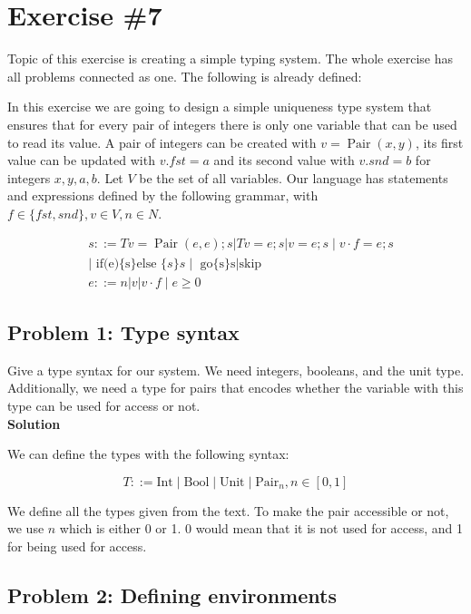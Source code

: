 \section{Exercise \#7}

Topic of this exercise is creating a simple typing system. The whole exercise has all problems connected as one. 
The following is already defined: 

In this exercise we are going to design a simple uniqueness type system that ensures that for every pair of integers there is only one variable that can be used to read its value. A pair of integers can be created with $v=\operatorname{Pair}(x, y)$, its first value can be updated with $v . f s t=a$ and its second value with $v . s n d=b$ for integers $x, y, a, b$. Let $V$ be the set of all variables. Our language has statements and expressions defined by the following grammar, with $f \in\{f s t, s n d\}, v \in V, n \in N$.

\[
\begin{aligned}
& s::=T v=\operatorname{Pair}(e, e) ; s|T v=e ; s| v=e ; s \mid v \cdot f=e ; s \\
& \mid \text { if(e)\{s\} else }\{s\} s \mid \text { go\{s\} s|skip } \\
& e::=n|v| v \cdot f \mid e \geq 0
\end{aligned}
\]


\subsection{Problem 1: Type syntax}


Give a type syntax for our system. We need integers, booleans, and the unit type.
Additionally, we need a type for pairs that encodes whether the variable with this type can be
used for access or not. \\

\textbf{Solution}

We can define the types with the following syntax:

\[
 T ::= \text{Int} \mid \text{Bool} \mid \text{Unit} \mid \text{Pair}_n, n \in [0,1] 
\]

We define all the types given from the text. To make the pair accessible or not, we use $n$ which is either 0 or 1. 
0 would mean that it is not used for access, and 1 for being used for access. 

\subsection{Problem 2: Defining environments}

